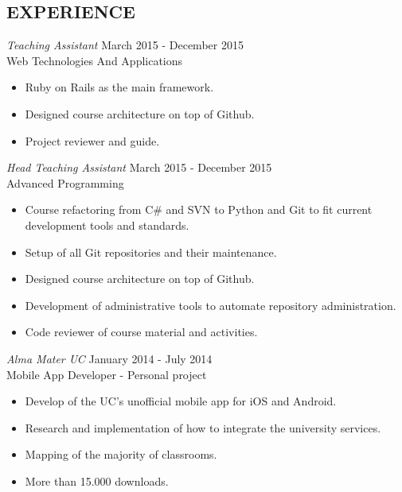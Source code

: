\documentclass[margin, 10pt]{res} %
\begin{document}
\begin{resume}

\section{EXPERIENCE}

{\sl Teaching Assistant} \hfill March 2015 - December 2015 \\
Web Technologies And Applications
\begin{itemize}  \itemsep -2pt
\item Ruby on Rails as the main framework.
\item Designed course architecture on top of Github.
\item Project reviewer and guide.
\end{itemize}

{\sl Head Teaching Assistant} \hfill March 2015 - December 2015 \\
Advanced Programming
\begin{itemize}  \itemsep -2pt
\item Course refactoring from C\# and SVN to Python and Git to fit current development tools and standards.
\item Setup of all Git repositories and their maintenance.
\item Designed course architecture on top of Github.
\item Development of administrative tools to automate repository administration.
\item Code reviewer of course material and activities.
\end{itemize}

{\sl Alma Mater UC } \hfill January 2014 - July 2014 \\
Mobile App Developer - Personal project
\begin{itemize}  \itemsep -2pt
\item Develop of the UC's unofficial mobile app for iOS and Android.
\item Research and implementation of how to integrate the university services.
\item Mapping of the majority of classrooms.
\item More than 15.000 downloads.
\end{itemize}

\end{resume}
\end{document}
